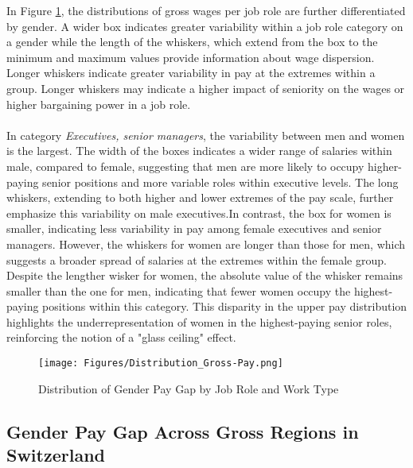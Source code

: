 \documentclass{article}
\begin{document}
In Figure \ref{fig:distribution_gross}, the distributions of gross wages per job role are further differentiated by gender. A wider box indicates greater variability within a job role category on a gender while the length of the whiskers, which extend from the box to the minimum and maximum values provide information about wage dispersion. Longer whiskers indicate greater variability in pay at the extremes within a group. Longer whiskers may indicate a higher impact of seniority on the wages or higher bargaining power in a job role. \\
\\
In category \textit{Executives, senior managers}, the variability between men and women is the largest. The width of the boxes indicates a wider range of salaries within male, compared to female, suggesting that men are more likely to occupy higher-paying senior positions and more variable roles within executive levels. The long whiskers, extending to both higher and lower extremes of the pay scale, further emphasize this variability on male executives.In contrast, the box for women is smaller, indicating less variability in pay among female executives and senior managers. However, the whiskers for women are longer than those for men, which suggests a broader spread of salaries at the extremes within the female group. \\
Despite the lengther wisker for women, the absolute value of the whisker remains smaller than the one for men, indicating that fewer women occupy the highest-paying positions within this category. This disparity in the upper pay distribution highlights the underrepresentation of women in the highest-paying senior roles, reinforcing the notion of a "glass ceiling" effect. 
\clearpage

\begin{figure}[t]
    \centering
    \texttt{[image: Figures/Distribution\_Gross-Pay.png]}
    \caption{Distribution of Gender Pay Gap by Job Role and Work Type}
    \label{fig:distribution_gross}
\end{figure}



\subsection{Gender Pay Gap Across Gross Regions in Switzerland}
\end{document}
